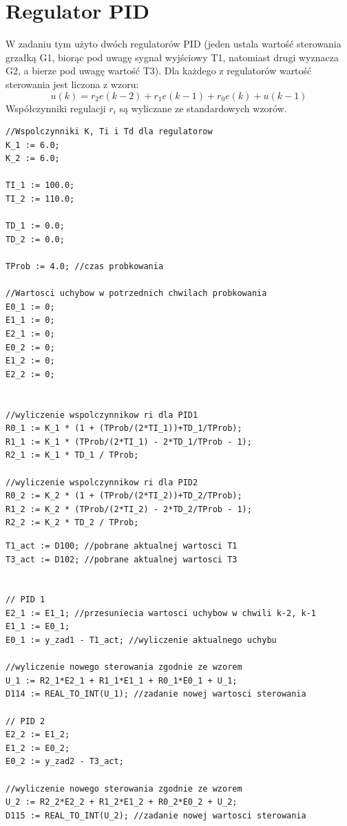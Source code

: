 \section{Regulator PID}

W zadaniu tym użyto dwóch regulatorów PID (jeden ustala wartość sterowania grzałką G1, biorąc pod uwagę sygnał wyjściowy T1, natomiast drugi wyznacza G2, a bierze pod uwagę wartość T3). Dla każdego z regulatorów wartość sterowania jest liczona z wzoru: 
\begin{equation}
u(k)=r_2e(k-2) + r_1e(k-1) + r_0e(k) + u(k-1)
\label{control_rule}
\end{equation}
Współczynniki regulacji $r_i$ są wyliczane ze standardowych wzorów.
\begin{lstlisting}[style=customc,frame=single, caption=Wyznaczenie współczynników regulacji , label=lst:overheat_lock] 
//Wspolczynniki K, Ti i Td dla regulatorow
K_1 := 6.0;
K_2 := 6.0;

TI_1 := 100.0;
TI_2 := 110.0;

TD_1 := 0.0;
TD_2 := 0.0;

TProb := 4.0; //czas probkowania

//Wartosci uchybow w potrzednich chwilach probkowania
E0_1 := 0;
E1_1 := 0;
E2_1 := 0;
E0_2 := 0;
E1_2 := 0;
E2_2 := 0;


//wyliczenie wspolczynnikow ri dla PID1
R0_1 := K_1 * (1 + (TProb/(2*TI_1))+TD_1/TProb);
R1_1 := K_1 * (TProb/(2*TI_1) - 2*TD_1/TProb - 1);
R2_1 := K_1 * TD_1 / TProb;

//wyliczenie wspolczynnikow ri dla PID2
R0_2 := K_2 * (1 + (TProb/(2*TI_2))+TD_2/TProb);
R1_2 := K_2 * (TProb/(2*TI_2) - 2*TD_2/TProb - 1);
R2_2 := K_2 * TD_2 / TProb;
\end{lstlisting}

\begin{lstlisting}[style=customc,frame=single, caption=Implementacja algorytmu PID , label=lst:overheat_lock] 
T1_act := D100; //pobrane aktualnej wartosci T1
T3_act := D102; //pobrane aktualnej wartosci T3


// PID 1
E2_1 := E1_1; //przesuniecia wartosci uchybow w chwili k-2, k-1
E1_1 := E0_1;
E0_1 := y_zad1 - T1_act; //wyliczenie aktualnego uchybu

//wyliczenie nowego sterowania zgodnie ze wzorem
U_1 := R2_1*E2_1 + R1_1*E1_1 + R0_1*E0_1 + U_1; 
D114 := REAL_TO_INT(U_1); //zadanie nowej wartosci sterowania

// PID 2
E2_2 := E1_2;
E1_2 := E0_2;
E0_2 := y_zad2 - T3_act;

//wyliczenie nowego sterowania zgodnie ze wzorem
U_2 := R2_2*E2_2 + R1_2*E1_2 + R0_2*E0_2 + U_2; 
D115 := REAL_TO_INT(U_2); //zadanie nowej wartosci sterowania
\end{lstlisting}

